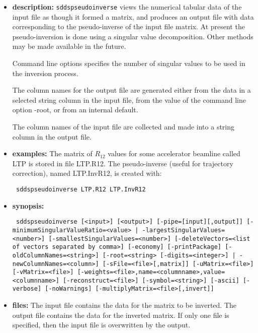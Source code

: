 \begin{itemize}
\item {\bf description:}
%
%
\verb|sddspseudoinverse| views the numerical tabular data of the input file
as though it formed a matrix, and produces an output
file with data corresponding to the pseudo-inverse of the input
file matrix. At present the pseudo-inversion is done using
a singular value decomposition. Other methods may be made available in the future.

Command line options specifies the number of singular values to be
used in the inversion process.

The column names for the output file are generated either from the data in
a selected string column in the input file,
from the value of the command line option -root,
or from an internal default.

The column names of the input file are collected and made into
a string column in the output file.

\item {\bf examples:} 
%
% 
%
The matrix of $R_{12}$ values for some accelerator beamline called LTP
is stored in file LTP.R12.
The pseudo-inverse (useful for trajectory correction), named
LTP.InvR12, is created with:

\begin{flushleft}{\tt
sddspseudoinverse LTP.R12 LTP.InvR12
}\end{flushleft}
\item {\bf synopsis:} 
%
%
\begin{flushleft}{\tt
sddspseudoinverse [<input>] [<output>] [-pipe=[input][,output]]
    [{-minimumSingularValueRatio=<value> | -largestSingularValues=<number>}] 
    [-smallestSingularValues=<number>] 
    [-deleteVectors=<list of vectors separated by comma>] 
    [-economy] [-printPackage] 
    [-oldColumnNames=<string>] [{-root=<string> [-digits=<integer>] | 
    -newColumnNames=<column>}] [-sFile=<file>[,matrix]] [-uMatrix=<file>] [-vMatrix=<file>] 
    [-weights=<file>,name=<columnname>,value=<columnname>]
    [-reconstruct=<file>] [-symbol=<string>] [-ascii] [-verbose] [-noWarnings]
    [-multiplyMatrix=<file>[,invert]]
}\end{flushleft}
\item {\bf files:}
The input file contains the data for the matrix to be inverted. The output file
contains the data for the inverted matrix. If only one file is specified,
then the input file is overwritten by the output.


\end{itemize}
